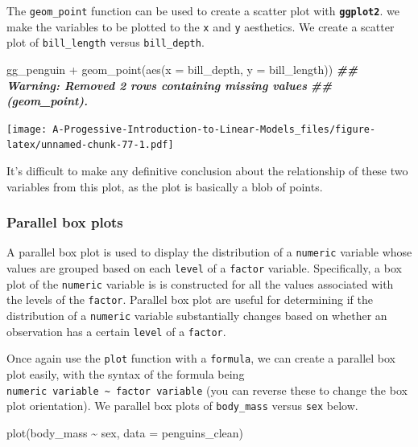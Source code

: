 \documentclass[
]{book}
\newenvironment{Shaded}{\begin{snugshade}}{\end{snugshade}}
\newcommand{\AttributeTok}[1]{\textcolor[rgb]{0.77,0.63,0.00}{#1}}
\newcommand{\DocumentationTok}[1]{\textcolor[rgb]{0.56,0.35,0.01}{\textbf{\textit{#1}}}}
\newcommand{\FunctionTok}[1]{\textcolor[rgb]{0.00,0.00,0.00}{#1}}
\newcommand{\NormalTok}[1]{#1}
\newcommand{\SpecialCharTok}[1]{\textcolor[rgb]{0.00,0.00,0.00}{#1}}
\theoremstyle{definition}
\theoremstyle{definition}
\theoremstyle{definition}
\theoremstyle{definition}
\theoremstyle{remark}
\begin{document}
The \texttt{geom\_point} function can be used to create a scatter plot with \textbf{\texttt{ggplot2}}. we make the variables to be plotted to the \texttt{x} and \texttt{y} aesthetics. We create a scatter plot of \texttt{bill\_length} versus \texttt{bill\_depth}.

\begin{Shaded}
\begin{Highlighting}[]
\NormalTok{gg\_penguin }\SpecialCharTok{+} \FunctionTok{geom\_point}\NormalTok{(}\FunctionTok{aes}\NormalTok{(}\AttributeTok{x =}\NormalTok{ bill\_depth, }\AttributeTok{y =}\NormalTok{ bill\_length))}
\DocumentationTok{\#\# Warning: Removed 2 rows containing missing values}
\DocumentationTok{\#\# (geom\_point).}
\end{Highlighting}
\end{Shaded}

\texttt{[image: A-Progessive-Introduction-to-Linear-Models\_files/figure-latex/unnamed-chunk-77-1.pdf]}

It's difficult to make any definitive conclusion about the relationship of these two variables from this plot, as the plot is basically a blob of points.

\hypertarget{parallel-box-plots}{%
\subsubsection{Parallel box plots}\label{parallel-box-plots}}

A parallel box plot is used to display the distribution of a \texttt{numeric} variable whose values are grouped based on each \texttt{level} of a \texttt{factor} variable. Specifically, a box plot of the \texttt{numeric} variable is is constructed for all the values associated with the levels of the \texttt{factor}. Parallel box plot are useful for determining if the distribution of a \texttt{numeric} variable substantially changes based on whether an observation has a certain \texttt{level} of a \texttt{factor}.

Once again use the \texttt{plot} function with a \texttt{formula}, we can create a parallel box plot easily, with the syntax of the formula being \texttt{numeric\ variable\ \textasciitilde{}\ factor\ variable} (you can reverse these to change the box plot orientation). We parallel box plots of \texttt{body\_mass} versus \texttt{sex} below.

\begin{Shaded}
\begin{Highlighting}[]
\FunctionTok{plot}\NormalTok{(body\_mass }\SpecialCharTok{\textasciitilde{}}\NormalTok{ sex, }\AttributeTok{data =}\NormalTok{ penguins\_clean)}
\end{Highlighting}
\end{Shaded}
\end{document}
